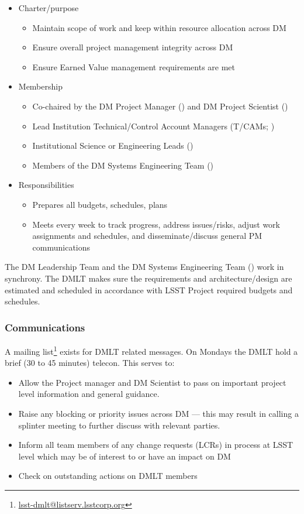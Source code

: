 \begin{itemize}
\item Charter/purpose
	\begin{itemize}
	\item Maintain scope of work and keep within resource allocation across DM
	\item Ensure overall project management integrity across DM
	\item Ensure Earned Value management requirements are met
	\end{itemize}
\item Membership
	\begin{itemize}
	\item Co-chaired by the DM Project Manager () and DM Project Scientist ()
	\item Lead Institution Technical/Control Account Managers (T/CAMs; )
	\item Institutional Science or Engineering Leads ()
	\item Members of the DM Systems Engineering Team ()
	\end{itemize}
\item Responsibilities
	\begin{itemize}
	\item Prepares all budgets, schedules, plans
	\item Meets every week to track progress, address issues/risks, adjust work assignments and schedules, and disseminate/discuss general PM communications
	\end{itemize}
\end{itemize}

The DM Leadership Team and the DM Systems Engineering Team () work in synchrony.
The DMLT makes sure the requirements and architecture/design are estimated and scheduled in accordance with LSST Project required budgets and schedules.

 \subsubsection{Communications}
A mailing list\footnote{\url{lsst-dmlt@listserv.lsstcorp.org}} exists for DMLT related messages.
On Mondays the DMLT hold a brief (30 to 45 minutes) telecon. This serves to:

\begin{itemize}
\item Allow the Project manager and DM Scientist  to pass on important project level information and general guidance.
\item Raise any blocking or priority issues across DM --- this may result in calling a splinter meeting to further discuss with relevant parties.
\item Inform all team members of any change requests (LCRs) in process at LSST level which may be of interest to or have an impact on DM
\item Check on outstanding actions on DMLT members
\end{itemize}

